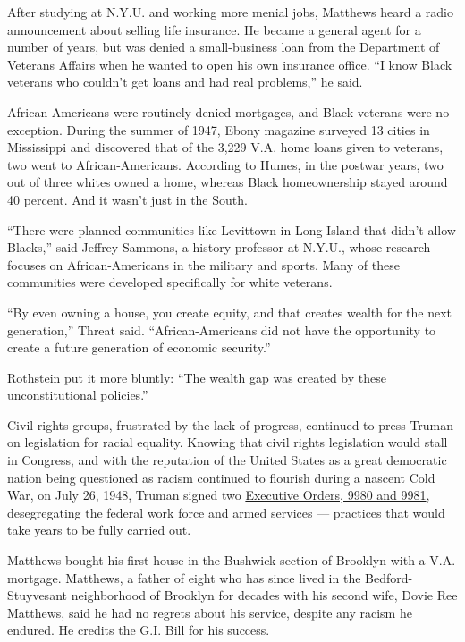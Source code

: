 After studying at N.Y.U. and working more menial jobs, Matthews heard a
radio announcement about selling life insurance. He became a general
agent for a number of years, but was denied a small-business loan from
the Department of Veterans Affairs when he wanted to open his own
insurance office. ``I know Black veterans who couldn't get loans and had
real problems,'' he said.

African-Americans were routinely denied mortgages, and Black veterans
were no exception. During the summer of 1947, Ebony magazine surveyed 13
cities in Mississippi and discovered that of the 3,229 V.A. home loans
given to veterans, two went to African-Americans. According to Humes, in
the postwar years, two out of three whites owned a home, whereas Black
homeownership stayed around 40 percent. And it wasn't just in the South.

``There were planned communities like Levittown in Long Island that
didn't allow Blacks,'' said Jeffrey Sammons, a history professor at
N.Y.U., whose research focuses on African-Americans in the military and
sports. Many of these communities were developed specifically for white
veterans.

``By even owning a house, you create equity, and that creates wealth for
the next generation,'' Threat said. ``African-Americans did not have the
opportunity to create a future generation of economic security.''

Rothstein put it more bluntly: ``The wealth gap was created by these
unconstitutional policies.''

Civil rights groups, frustrated by the lack of progress, continued to
press Truman on legislation for racial equality. Knowing that civil
rights legislation would stall in Congress, and with the reputation of
the United States as a great democratic nation being questioned as
racism continued to flourish during a nascent Cold War, on July 26,
1948, Truman signed two
\href{https://prologue.blogs.archives.gov/2014/05/19/executive-orders-9980-and-9981-ending-segregation-in-the-armed-forces-and-the-federal-workforce/\#:~:text=Pieces\%20of\%20History-,Executive\%20Orders\%209980\%20and\%209981\%3A\%20Ending\%20segregation\%20in\%20the,Forces\%20and\%20the\%20Federal\%20workforce\&text=Without\%20Congress's\%20blessing\%2C\%20the\%20executive,carry\%20the\%20force\%20of\%20law.}{Executive
Orders, 9980 and 9981}, desegregating the federal work force and armed
services --- practices that would take years to be fully carried out.

Matthews bought his first house in the Bushwick section of Brooklyn with
a V.A. mortgage. Matthews, a father of eight who has since lived in the
Bedford-Stuyvesant neighborhood of Brooklyn for decades with his second
wife, Dovie Ree Matthews, said he had no regrets about his service,
despite any racism he endured. He credits the G.I. Bill for his success.

